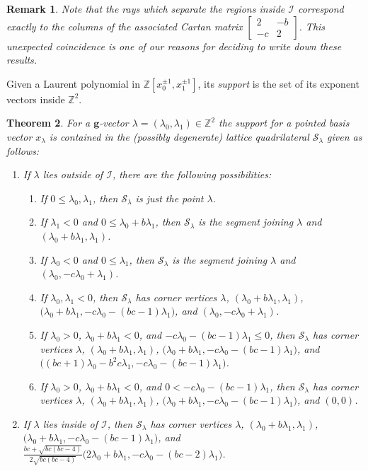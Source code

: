 \documentclass{amsart}
\newtheorem{theorem}{Theorem}
\newtheorem{remark}[theorem]{Remark}
\numberwithin{theorem}{section}
\newcommand{\bfg}{\boldsymbol{g}}
\newcommand{\cI}{\mathcal{I}}
\newcommand{\cS}{\mathcal{S}}
\newcommand{\ZZ}{\mathbb{Z}}
\begin{document}
  \begin{remark}
    Note that the rays which separate the regions inside $\cI$ correspond exactly to the columns of the associated Cartan matrix $\left[ \begin{array}{cc} 2 & -b \\ -c & 2 \end{array} \right]$.
    This unexpected coincidence is one of our reasons for deciding to write down these results.
  \end{remark}

  Given a Laurent polynomial in $\ZZ[x_0^{\pm1},x_1^{\pm1}]$, its \emph{support} is the set of its exponent vectors inside $\ZZ^2$.
  \begin{theorem}
    \label{th:maximum support}
    For a $\bfg$-vector $\lambda=(\lambda_0,\lambda_1)\in\ZZ^2$ the support for a pointed basis vector $x_\lambda$ is contained in the (possibly degenerate) lattice quadrilateral $\cS_\lambda$ given as follows:
    \begin{enumerate}
      \item If $\lambda$ lies outside of $\cI$, there are the following possibilities:
        \begin{enumerate}
          \item If $0\le\lambda_0,\lambda_1$, then $\cS_\lambda$ is just the point $\lambda$.
          \item If $\lambda_1 < 0$ and $0\le\lambda_0+b\lambda_1$, then $\cS_\lambda$ is the segment joining $\lambda$ and $(\lambda_0+b\lambda_1,\lambda_1)$.
          \item If $\lambda_0 < 0$ and $0\le\lambda_1$, then $\cS_\lambda$ is the segment joining $\lambda$ and $(\lambda_0,-c\lambda_0+\lambda_1)$.
          \item If $\lambda_0,\lambda_1 < 0$, then $\cS_\lambda$ has corner vertices $\lambda$, $(\lambda_0+b\lambda_1,\lambda_1)$, $\big(\lambda_0+b\lambda_1,-c\lambda_0-(bc-1)\lambda_1\big)$, and $(\lambda_0,-c\lambda_0+\lambda_1)$.
          \item If $\lambda_0 > 0$, $\lambda_0+b\lambda_1 < 0$, and $-c\lambda_0-(bc-1)\lambda_1\le 0$, then $\cS_\lambda$ has corner vertices $\lambda$, $(\lambda_0+b\lambda_1,\lambda_1)$, $\big(\lambda_0+b\lambda_1,-c\lambda_0-(bc-1)\lambda_1\big)$, and $\big((bc+1)\lambda_0-b^2c\lambda_1,-c\lambda_0-(bc-1)\lambda_1\big)$.
          \item If $\lambda_0 > 0$, $\lambda_0+b\lambda_1 < 0$, and $0 < -c\lambda_0-(bc-1)\lambda_1$, then $\cS_\lambda$ has corner vertices $\lambda$, $(\lambda_0+b\lambda_1,\lambda_1)$, $\big(\lambda_0+b\lambda_1,-c\lambda_0-(bc-1)\lambda_1\big)$, and $(0,0)$.
        \end{enumerate}
      \item If $\lambda$ lies inside of $\cI$, then $\cS_\lambda$ has corner vertices $\lambda$, $(\lambda_0+b\lambda_1,\lambda_1)$, $\big(\lambda_0+b\lambda_1,-c\lambda_0-(bc-1)\lambda_1\big)$, and $\frac{bc+\sqrt{bc(bc-4)}}{2\sqrt{bc(bc-4)}}\big(2\lambda_0+b\lambda_1,-c\lambda_0-(bc-2)\lambda_1\big)$.
    \end{enumerate}
  \end{theorem}
\end{document}
